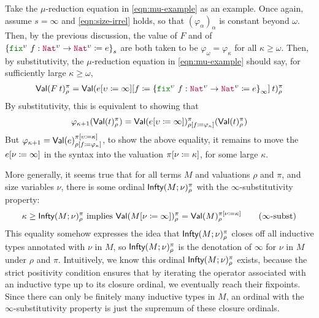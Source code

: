 Take the $\mu$-reduction equation in \eqref{eqn:mu-example} as an
example.
%
Once again, assume $s=\infty$ and \eqref{eqn:size-irrel} holds, so that
$(\varphi_\alpha)_\alpha$ is constant beyond $\omega$.
%
Then, by the previous discussion, the value of $F$ and of
$\left\{\kw{fix}^\upsilon ~ f : \Nat^\upsilon \to \Nat^\upsilon
  \coloneqq e\right\}_{s}$ are both taken to be
$\varphi_\omega = \varphi_{\kappa}$ for all $\kappa \geq \omega$.
%
Then, by substitutivity, the $\mu$-reduction equation in
\eqref{eqn:mu-example} should say, for sufficiently large
$\kappa \geq \omega$,
%
\begin{align*}
  \Val(\app{F}{t})_\rho^\pi =
  \Val(\app{\subst{\subst{e}{\upsilon}{\infty}}{f}{
  \left\{\kw{fix}^\upsilon ~ f : \Nat^\upsilon \to \Nat^\upsilon \coloneqq e\right\}_{\infty}
  }}{t})_\rho^\pi
\end{align*}
%
By substitutivity, this is equivalent to showing that
%
\begin{align*}
  \varphi_{\kappa+1}(\textsf{Val}(t)_\rho^\pi) =
  \textsf{Val}(e [\upsilon \coloneqq \infty])_{\rho [f \coloneqq \varphi_\kappa]}^{\pi}(\textsf{Val}(t)_\rho^\pi)
\end{align*}
%
But
$\varphi_{\kappa+1} =
\textsf{Val}(e)_{\rho [f \coloneqq \varphi_\kappa]}^{\pi [\upsilon \coloneqq \kappa]}$,
to show the above equality, it remains to move the
$e [\nu \coloneqq \infty]$ in the syntax into the valuation
$\pi [\nu \coloneqq \kappa]$, for some large $\kappa$.

More generally, it seems true that for all terms $M$ and valuations
$\rho$ and $\pi$, and size variables $\nu$, there is some ordinal
$\textsf{Infty}(M;\nu)_\rho^\pi$ with the $\infty$-substitutivity property:
%
\begin{align*}
  \kappa \geq \Infty(M;\nu)_\rho^\pi \text{ implies }
  \Val(\subst{M}{\nu}{\infty})_\rho^\pi = \Val(M)_\rho^{\subst{\pi}{\nu}{\kappa}}
  \label{eqn:infty-subst}\tag{$\infty$-subst}
\end{align*}
%
This equality somehow expresses the idea that $\textsf{Infty}(M;\nu)_\rho^\pi$
closes off all inductive types annotated with $\nu$ in $M$, so
$\textsf{Infty}(M;\nu)_\rho^\pi$ is the denotation of $\infty$ for $\nu$ in
$M$ under $\rho$ and $\pi$.
%
Intuitively, we know this ordinal $\textsf{Infty}(M;\nu)_\rho^\pi$ exists,
because the strict positivity condition ensures that by iterating the
operator associated with an inductive type up to its closure ordinal,
we eventually reach their fixpoints.
%
Since there can only be finitely many inductive types in $M$, an
ordinal with the $\infty$-substitutivity property is just the
supremum of these closure ordinals.

